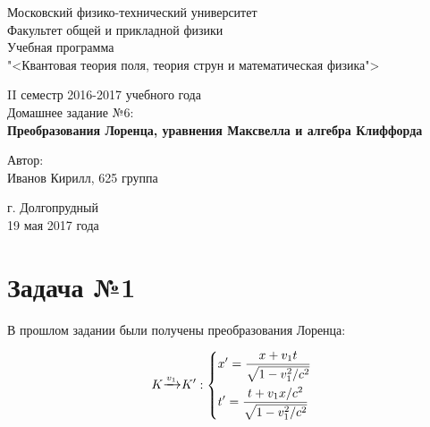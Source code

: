 \documentclass[12pt]{kiarticle}
\begin{document}
\begin{titlepage}		
	\begin{center}
		\large 	Московский физико-технический университет \\
		Факультет общей и прикладной физики \\
		\vspace{0.2cm}
		Учебная программа\\
		"<Квантовая теория поля, теория струн и математическая физика">
		
		\vspace{4.5cm}
		II семестр 2016-2017 учебного года \\ \vspace{0.1cm}
		\large Домашнее задание №6: \\ \vspace{0.1cm}
		\LARGE \textbf{Преобразования Лоренца, уравнения Максвелла и алгебра Клиффорда}
	\end{center}
	\vspace{2.3cm} \large
	
	\begin{center}
		Автор: \\
		Иванов Кирилл,
		625 группа
		\vspace{10mm}
		
		
	\end{center}
	
	\begin{center} \vspace{50mm}
		г. Долгопрудный \\ 
		19 мая 2017 года
	\end{center}
\end{titlepage}


\section{Задача №1}

В прошлом задании были получены преобразования Лоренца:

\begin{equation}
K {\large \xrightarrow{v_1}} K':
\left\{
\begin{aligned}
&x' = \dfrac{x + v_1t}{\sqrt{1-v_1^2/c^2}} \\
&t' = \dfrac{t + v_1x/c^2}{\sqrt{1-v_1^2/c^2}} \\
\end{aligned}
\right.
\end{equation}
\end{document}
